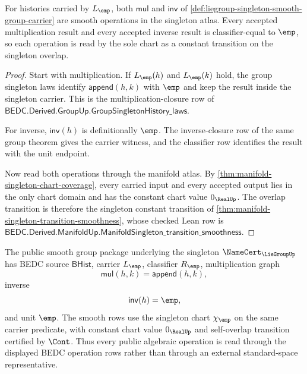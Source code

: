 \begin{theorem}
\label{thm:liegroup-singleton-operation-smoothness-obligation}
For histories carried by $L_{\emp}$, both $\mathsf{mul}$ and $\mathsf{inv}$ of
\autoref{def:liegroup-singleton-smooth-group-carrier} are smooth operations in
the singleton atlas. Every accepted multiplication result and every accepted
inverse result is classifier-equal to $\emp$, so each operation is read by the
sole chart as a constant transition on the singleton overlap.
\end{theorem}
\begin{proof}
Start with multiplication. If $L_{\emp}(h)$ and $L_{\emp}(k)$ hold, the group
singleton laws identify $\mathsf{append}(h,k)$ with $\emp$ and keep the result
inside the singleton carrier. This is the multiplication-closure row of
$\mathsf{BEDC.Derived.GroupUp.GroupSingletonHistory\_laws}$.

For inverse, $\mathsf{inv}(h)$ is definitionally $\emp$. The inverse-closure
row of the same group theorem gives the carrier witness, and the classifier
row identifies the result with the unit endpoint.

Now read both operations through the manifold atlas. By
\autoref{thm:manifold-singleton-chart-coverage}, every carried input and every
accepted output lies in the only chart domain and has the constant chart value
$0_{\RealUp}$. The overlap transition is therefore the singleton constant
transition of \autoref{thm:manifold-singleton-transition-smoothness}, whose
checked Lean row is
$\mathsf{BEDC.Derived.ManifoldUp.ManifoldSingleton\_transition\_smoothness}$.
\end{proof}

\begin{definition}
\label{def:liegroup-singleton-public-smooth-group-package}
The public smooth group package underlying the singleton
$\NameCert_{\LieGroupUp}$ has BEDC source $\mathsf{BHist}$, carrier
$L_{\emp}$, classifier $R_{\emp}$, multiplication graph
$$
\mathsf{mul}(h,k)=\mathsf{append}(h,k),
$$
inverse
$$
\mathsf{inv}(h)=\emp,
$$
and unit $\emp$. The smooth rows use the singleton chart $\chi_{\emp}$ on the
same carrier predicate, with constant chart value $0_{\RealUp}$ and self-overlap
transition certified by $\Cont$. Thus every public algebraic operation is read
through the displayed BEDC operation rows rather than through an external
standard-space representative.
\end{definition}

